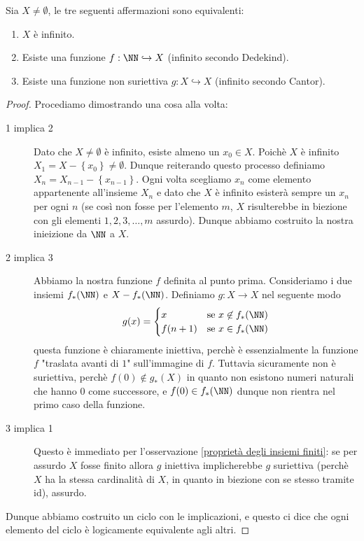 \documentclass[11pt]{scrartcl}
\newcommand{\inj}{\hookrightarrow}
\begin{document}
	\begin{theorem}
		Sia $X\ne\emptyset$, le tre seguenti affermazioni sono equivalenti:
		\begin{enumerate}
			\item $X$ è infinito.
			\item Esiste una funzione $f:\NN\inj X$ (infinito secondo Dedekind).
			\item Esiste una funzione non suriettiva $g:X\inj X$ (infinito secondo Cantor).
		\end{enumerate}
	\end{theorem}
	\begin{proof}
		Procediamo dimostrando una cosa alla volta:
		\begin{description}
			\item[1 implica 2] Dato che $X\ne\emptyset$ è infinito, esiste almeno un $x_0\in X$. Poichè $X$ è infinito $X_1=X-\left\{x_0\right\}\ne\emptyset$. Dunque reiterando questo processo definiamo $X_n=X_{n-1}-\left\{x_{n-1}\right\}$. Ogni volta scegliamo $x_n$ come elemento appartenente all'insieme $X_n$ e dato che $X$ è infinito esisterà sempre un $x_n$ per ogni $n$ (se così non fosse per l'elemento $m$, $X$ risulterebbe in biezione con gli elementi $1,2,3,\dots,m$ assurdo). Dunque abbiamo costruito la nostra inieizione da $\NN$ a $X$.
			\item[2 implica 3] Abbiamo la nostra funzione $f$ definita al punto prima. Consideriamo i due insiemi $f_*(\NN)$ e $X-f_*(\NN)$. Definiamo $g:X\to X$ nel seguente modo
			$$
			g(x)=
			\begin{cases}
				x & \text{se } x\not\in f_*(\NN) \\
				f(n+1) & \text{se } x\in f_*(\NN)
			\end{cases}
			$$
			questa funzione è chiaramente iniettiva, perchè è essenzialmente la funzione $f$ "traslata avanti di $1$" sull'immagine di $f$. Tuttavia sicuramente non è suriettiva, perchè $f(0)\not\in g_*(X)$ in quanto non esistono numeri naturali che hanno $0$ come successore, e $f(0)\in f_*(\NN)$ dunque non rientra nel primo caso della funzione.
			\item[3 implica 1] Questo è immediato per l'osservazione  \ref{proprietà degli insiemi finiti}: se per assurdo $X$ fosse finito allora $g$ iniettiva implicherebbe $g$ suriettiva (perchè $X$ ha la stessa cardinalità di $X$, in quanto in biezione con se stesso tramite id), assurdo.
		\end{description}
		Dunque abbiamo costruito un ciclo con le implicazioni, e questo ci dice che ogni elemento del ciclo è logicamente equivalente agli altri.
	\end{proof}
\end{document}
